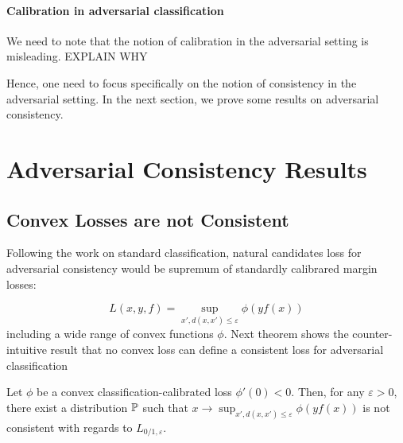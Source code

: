 \paragraph{Calibration in adversarial classification} We need to note that the notion of calibration in the adversarial setting is misleading. EXPLAIN WHY 



Hence, one need to focus specifically on the notion of consistency in the adversarial setting. In the next section, we prove some results on adversarial consistency.

\section{Adversarial Consistency Results}

\subsection{Convex Losses are not Consistent}
Following the work on standard classification, natural candidates loss for adversarial consistency would be supremum of standardly calibrared margin losses:

$$L(x,y,f)=\sup_{x', d(x,x')\leq\varepsilon}\phi(yf(x))$$
including a wide range of  convex functions $\phi$. Next theorem shows the counter-intuitive result that no convex loss can define a consistent loss for adversarial classification
\begin{prop}
Let $\phi$ be a convex classification-calibrated loss $\phi'(0) <0$. Then, for any $\varepsilon > 0$, there exist a distribution $\mathbb{P}$ such that $x\to\sup_{x', d(x,x')\leq\varepsilon}\phi(yf(x))$ is not consistent with regards to $L_{0/1,\varepsilon}$.
\end{prop}

